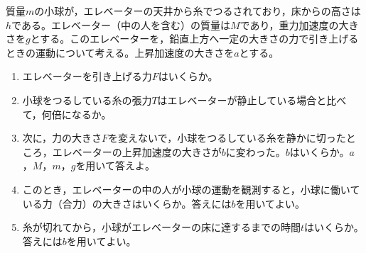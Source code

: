 \hakosyokika
\item
    \begin{mawarikomi}{80pt}{}
        質量$m$の小球が，エレベーターの天井から糸でつるされており，床からの高さは$h$である。エレベーター（中の人を含む）の質量は$M$であり，重力加速度の大きさを$g$とする。このエレベーターを，鉛直上方へ一定の大きさの力で引き上げるときの運動について考える。上昇加速度の大きさを$a$とする。
        \begin{enumerate}
            \item エレベーターを引き上げる力$F$はいくらか。
            \item 小球をつるしている糸の張力$T$はエレベーターが静止している場合と比べて，何倍になるか。
            \item 次に，力の大きさ$F$を変えないで，小球をつるしている糸を静かに切ったところ，エレベーターの上昇加速度の大きさが$b$に変わった。$b$はいくらか。$a$，$M$，$m$，$g$を用いて答えよ。
            \item このとき，エレベーターの中の人が小球の運動を観測すると，小球に働いている力（合力）の大きさはいくらか。答えには$b$を用いてよい。
            \item 糸が切れてから，小球がエレベーターの床に達するまでの時間$t$はいくらか。答えには$b$を用いてよい。
        \end{enumerate}
    \end{mawarikomi}